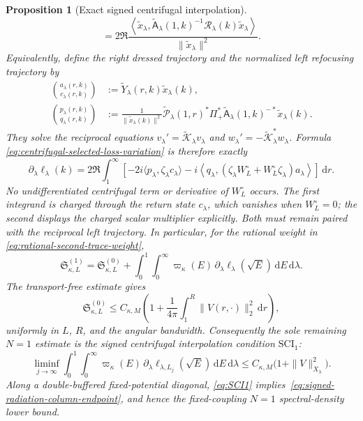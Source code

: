 \documentclass[11pt]{article}
\newcommand{\dd}{\,\mathrm d}
\newtheorem{proposition}[theorem]{Proposition}
\theoremstyle{definition}
\theoremstyle{remark}
\begin{document}
\begin{proposition}[Exact signed centrifugal interpolation]
\begin{equation}
 =2\Re\frac{\left\langle \widetilde x_\lambda,
  \widetilde{\mathsf A}_\lambda(1,k)^{-1}
  \mathcal R_\lambda(k)\widetilde x_\lambda
  \right\rangle}{\|\widetilde x_\lambda\|^2}.
 \label{eq:centrifugal-selected-loss-variation}
\end{equation}
Equivalently, define the right dressed trajectory and the normalized left
refocusing trajectory by
\begin{align}
 \binom{a_\lambda(r,k)}{c_\lambda(r,k)}
 &:=\widetilde Y_\lambda(r,k)\widetilde x_\lambda(k),
 \label{eq:right-curvature-trajectory}\\
 \binom{p_\lambda(r,k)}{q_\lambda(r,k)}
 &:=\frac{1}{\|\widetilde x_\lambda(k)\|^2}
   \widetilde{\mathcal P}_\lambda(1,r)^*\Pi_+^*
   \widetilde{\mathsf A}_\lambda(1,k)^{-*}
   \widetilde x_\lambda(k).
 \label{eq:left-curvature-trajectory}
\end{align}
They solve the reciprocal equations
$v_\lambda'=\widetilde{\mathcal K}_\lambda v_\lambda$ and
$w_\lambda'=-\widetilde{\mathcal K}_\lambda^*w_\lambda$.  Formula
\eqref{eq:centrifugal-selected-loss-variation} is therefore exactly
\begin{equation}
 \boxed{
 \partial_\lambda\ell_\lambda(k)
 =2\Re\int_1^\infty\left[
  -2i\langle p_\lambda,\zeta_\lambda c_\lambda\rangle
  -i\left\langle q_\lambda,
    (\zeta_\lambda W_L^\circ+W_L^\circ\zeta_\lambda)
    a_\lambda\right\rangle
 \right]\dd r.}
 \label{eq:explicit-signed-curvature-work}
\end{equation}
No undifferentiated centrifugal term or derivative of $W_L^\circ$ occurs.
The first integrand is charged through the return state $c_\lambda$, which
vanishes when $W_L^\circ=0$; the second displays the charged scalar multiplier
explicitly.  Both must remain paired with the reciprocal left trajectory.
In particular, for the rational weight in
\eqref{eq:rational-second-trace-weight},
\begin{equation}
 \mathfrak S_{\kappa,L}^{(1)}
 =\mathfrak S_{\kappa,L}^{(0)}
 +\int_0^1\int_0^\infty
   \varpi_\kappa(E)\,
   \partial_\lambda\ell_\lambda(\sqrt E)
   \dd E\dd\lambda.
 \label{eq:exact-signed-centrifugal-interpolation}
\end{equation}
The transport-free estimate gives
\begin{equation}
 \mathfrak S_{\kappa,L}^{(0)}
 \leq C_{\kappa,M}
 \left(1+\frac1{4\pi}
  \int_1^R\|V(r,\cdot)\|_2^2\dd r\right),
 \label{eq:transport-free-rational-signed-bound}
\end{equation}
uniformly in $L$, $R$, and the angular bandwidth.  Consequently the sole
remaining $N=1$ estimate is the signed centrifugal interpolation condition
$\mathrm{SCI}_1$:
\begin{equation}
 \liminf_{j\to\infty}
 \int_0^1\int_0^\infty
  \varpi_\kappa(E)\,
  \partial_\lambda\ell_{\lambda,L_j}(\sqrt E)
  \dd E\dd\lambda
 \leq C_{\kappa,M}\bigl(1+\|V\|_{X_3}^2\bigr).
 \label{eq:SCI1}
\end{equation}
Along a double-buffered fixed-potential diagonal,
\eqref{eq:SCI1} implies~\eqref{eq:signed-radiation-column-endpoint}, and hence
the fixed-coupling $N=1$ spectral-density lower bound.
\end{proposition}
\end{document}
